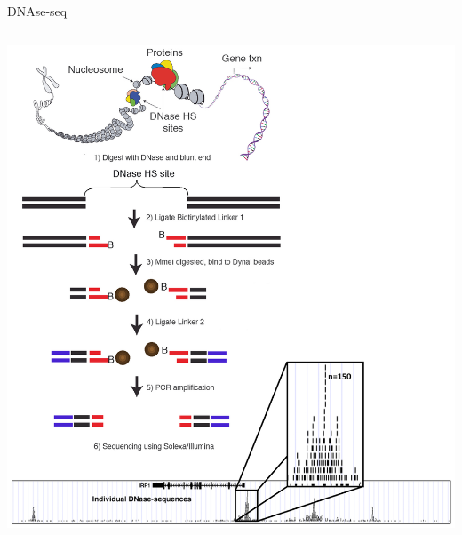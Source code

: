 \documentclass{beamer}
\begin{document}
\begin{frame}{DNAse-seq}
\begin{columns}
\includegraphics[width=\linewidth]{song_2010_dnase-seq.png}
\end{columns}
\end{frame}

\end{document}

